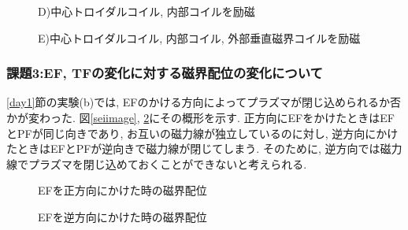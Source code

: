 \documentclass[]{jsarticle}
\begin{document}
	\begin{figure}[htbp]
		\begin{minipage}{0.33\hsize}
			\begin{center}
				\caption{D)中心トロイダルコイル, 内部コイルを励磁}
				\label{TFPF_image}
			\end{center}
		\end{minipage}
		\begin{minipage}{0.33\hsize}
			\begin{center}
				\caption{E)中心トロイダルコイル, 内部コイル, 外部垂直磁界コイルを励磁}
				\label{Allimage}
			\end{center}
		\end{minipage}
	\end{figure}

		
		\subsubsection{課題3:EF, TFの変化に対する磁界配位の変化について}
		\ref{day1}節の実験(b)では, EFのかける方向によってプラズマが閉じ込められるか否かが変わった. 図\ref{seiimage}, \ref{gyakuimage}にその概形を示す. 正方向にEFをかけたときはEFとPFが同じ向きであり, お互いの磁力線が独立しているのに対し, 逆方向にかけたときはEFとPFが逆向きで磁力線が閉じてしまう. そのために, 逆方向では磁力線でプラズマを閉じ込めておくことができないと考えられる. 
		
		\begin{figure}[htbp]
		\begin{minipage}{0.5\hsize}
			\begin{center}
				\caption{EFを正方向にかけた時の磁界配位}
				\label{seiimage}
			\end{center}
		\end{minipage}
		\begin{minipage}{0.5\hsize}
			\begin{center}
				\caption{EFを逆方向にかけた時の磁界配位}
				\label{gyakuimage}
			\end{center}
		\end{minipage}
	        \end{figure}

		
\end{document}
